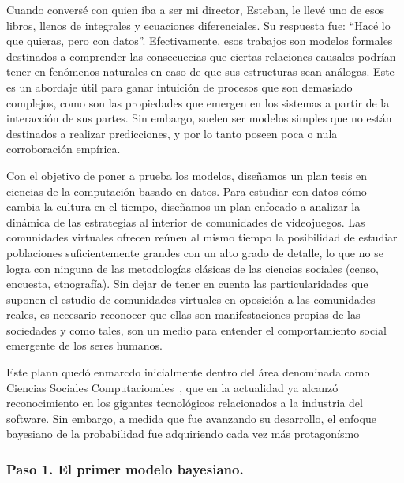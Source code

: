 \documentclass[a4paper,11pt]{book}
\theoremstyle{definition}
\begin{document}

Cuando conversé con quien iba a ser mi director, Esteban, le llevé uno de esos libros, llenos de integrales y ecuaciones diferenciales.
%
Su respuesta fue: ``Hacé lo que quieras, pero con datos''.
%
Efectivamente, esos trabajos son modelos formales destinados a comprender las consecuecias que ciertas relaciones causales podrían tener en fenómenos naturales en caso de que sus estructuras sean análogas.
%
Este es un abordaje útil para ganar intuición de procesos que son demasiado complejos, como son las propiedades que emergen en los sistemas a partir de la interacción de sus partes.
%
Sin embargo, suelen ser modelos simples que no están destinados a realizar predicciones, y por lo tanto poseen poca o nula corroboración empírica.


Con el objetivo de poner a prueba los modelos, diseñamos un plan tesis en ciencias de la computación basado en datos.
%
Para estudiar con datos cómo cambia la cultura en el tiempo, diseñamos un plan enfocado a analizar la dinámica de las estrategias al interior de comunidades de videojuegos.
%
Las comunidades virtuales ofrecen re\'unen al mismo tiempo la posibilidad de estudiar poblaciones suficientemente grandes con un alto grado de detalle, lo que no se logra con ninguna de las metodolog\'ias cl\'asicas de las ciencias sociales (censo, encuesta, etnograf\'ia).
%
Sin dejar de tener en cuenta las particularidades que suponen el estudio de comunidades virtuales en oposici\'on a las comunidades reales, es necesario reconocer que ellas son manifestaciones propias de las sociedades y como tales, son un medio para entender el comportamiento social emergente de los seres humanos.


Este plann quedó enmarcdo inicialmente dentro del área denominada como Ciencias Sociales Computacionales~\cite{lazer2009-computationalSocialScience}, que en la actualidad ya alcanzó reconocimiento en los gigantes tecnológicos relacionados a la industria del software.
%
Sin embargo, a medida que fue avanzando su desarrollo, el enfoque bayesiano de la probabilidad fue adquiriendo cada vez más protagonísmo


\subsubsection{Paso 1. El primer modelo bayesiano.}
\end{document}
